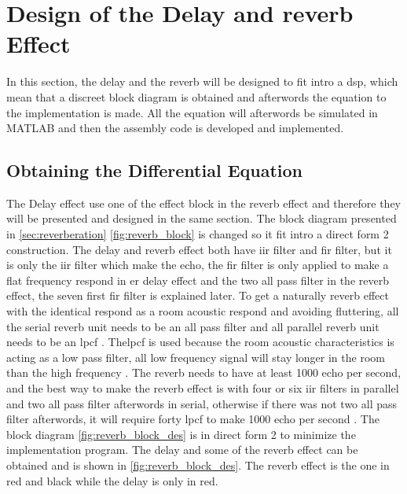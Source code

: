 \section{Design of the Delay and \gls{reverb} Effect}
In this section, the delay and the \gls{reverb} will be designed to fit intro a \gls{dsp}, which mean that a discreet block diagram is obtained and afterwords the equation to the implementation is made. All the equation will afterwords be simulated in MATLAB and then the assembly code is developed and implemented. 


\subsection{Obtaining the Differential Equation}
The Delay effect use one of the effect block in the \gls{reverb} effect and therefore they will be presented and designed in the same section. The block diagram presented in \autoref{sec:reverberation} \autoref{fig:reverb_block} is changed so it fit intro a direct form 2 construction. 
The delay and \gls{reverb} effect both have \gls{iir} filter and \gls{fir} filter, but it is only the \gls{iir} filter which make the echo, the \gls{fir} filter is only applied to make a flat frequency respond in er delay effect and the two all pass filter in the \gls{reverb} effect, the seven first \gls{fir} filter is explained later. To get a naturally \gls{reverb} effect with the identical respond as a room acoustic respond and avoiding fluttering, all the serial \gls{reverb} unit needs to be an all pass filter and all parallel \gls{reverb} unit needs to be an \gls{lpcf} \citep{LPCF}. The\gls{lpcf} is used because the room acoustic characteristics is acting as a low pass filter, all low frequency signal will stay longer in the room than the high frequency \citep{rfi}. The \gls{reverb} needs to have at least 1000 echo per second, and the best way to make the \gls{reverb} effect is with four or six \gls{iir} filters in parallel and two all pass filter afterwords in serial, otherwise if there was not two all pass filter afterwords, it will require forty \gls{lpcf} to make 1000 echo per second \citep{natural_sounding_revorb}. The block diagram \autoref{fig:reverb_block_des} is in direct form 2 to minimize the implementation program. The delay and some of the \gls{reverb} effect can be obtained and is shown in \autoref{fig:reverb_block_des}. The \gls{reverb} effect is the one in red and black while the delay is only in red. 

\newpage


